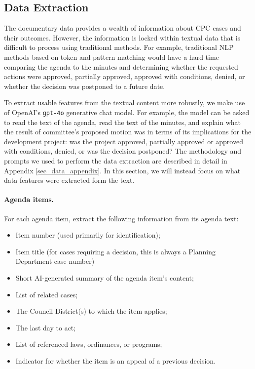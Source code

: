 \subsection{Data Extraction}

The documentary data provides a wealth of information about CPC cases and their outcomes. However, the information is locked within textual data that is difficult to process using traditional methods. For example, traditional NLP methods based on token and pattern matching would have a hard time comparing the agenda to the minutes and determining whether the requested actions were approved, partially approved, approved with conditions, denied, or whether the decision was postponed to a future date. 

To extract usable features from the textual content more robustly, we make use of OpenAI's \texttt{gpt-4o} generative chat model. For example, the model can be asked to read the text of the agenda, read the text of the minutes, and explain what the result of committee's proposed motion was in terms of its implications for the development project: was the project approved, partially approved or approved with conditions, denied, or was the decision postponed? The methodology and prompts we used to perform the data extraction are described in detail in Appendix \ref{sec_data_appendix}. In this section, we will instead focus on what data features were extracted form the text.

\paragraph{Agenda items.} For each agenda item, extract the following information from its agenda text: 
\begin{itemize}
\item Item number (used primarily for identification);
\item Item title (for cases requiring a decision, this is always a Planning Department case number)
\item Short AI-generated summary of the agenda item's content;
\item List of related cases;
\item The Council District(s) to which the item applies;
\item The last day to act;
\item List of referenced laws, ordinances, or programs;
\item Indicator for whether the item is an appeal of a previous decision.
\end{itemize}

